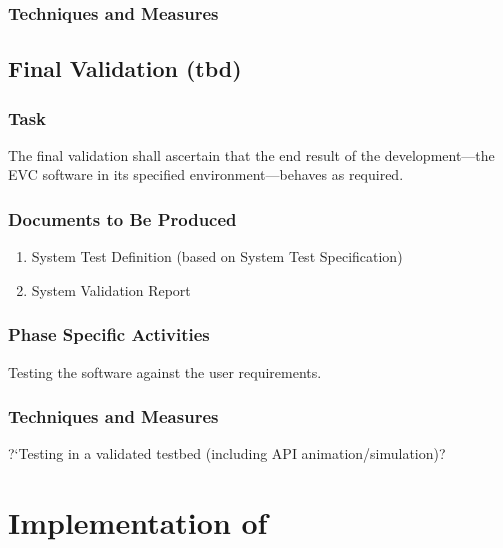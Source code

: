 \documentclass{template/openetcs_report}
\newcommand{\qq}[1]{?`#1?}
\begin{document}
\tbd{}

\subsubsection{Techniques and Measures}
\label{sec:sfm-valid-techniques-measures}

\tbd{}

\subsection{Final Validation (tbd)}
\label{sec:final-validation}

\subsubsection{Task}
\label{sec:final-valid-task}

The final validation shall ascertain that the end result of the
development---the EVC software in its specified environment---behaves
as required. 

\subsubsection{Documents to Be Produced}
\label{sec:final-valid-docum-be-prod}

\begin{enumerate}
\item System Test Definition (based on System Test Specification)
\item System Validation Report
\end{enumerate}

\subsubsection{Phase Specific Activities}
\label{sec:final-valid-phase-spec-activ}

Testing the software against the user requirements.

\subsubsection{Techniques and Measures}
\label{sec:final-valid-techniques-measures}

\qq{Testing in a validated testbed (including API animation/simulation)}


\section{Implementation of \VV}
\label{sec:implementation-vv}
\end{document}
